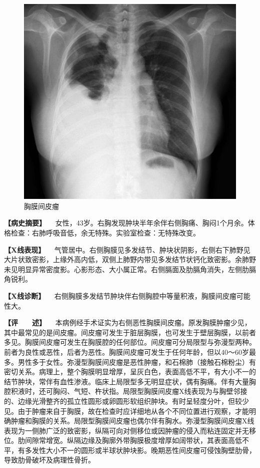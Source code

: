 \begin{figure}[!htbp]
 \centering
 \includegraphics{./images/Image00193.jpg}
 \captionsetup{justification=centering}
 \caption{胸膜间皮瘤}
 \label{fig3-11-7}
  \end{figure} 

\textbf{【病史摘要】}
　女性，43岁。右胸发现肿块半年余伴右侧胸痛、胸闷1个月余。体格检查：右肺呼吸音低，余无特殊。实验室检查：无特殊改变。

\textbf{【X线表现】}
　气管居中。右侧胸膜见多发结节、肿块状阴影，右侧右下肺野见大片状致密影，上缘外高内低，双侧上肺野内带见多发结节状钙化致密影。余肺野未见明显异常密度影。心影形态、大小属正常。右侧膈面及肋膈角消失，左侧肋膈角锐利。

\textbf{【X线诊断】}
　右侧胸膜多发结节肿块伴右侧胸腔中等量积液，胸膜间皮瘤可能性大。

\textbf{【评　　述】}
　本病例经手术证实为右侧恶性胸膜间皮瘤。原发胸膜肿瘤少见，其中最常见的是间皮瘤。间皮瘤可发生于脏层胸膜，也可发生于壁层胸膜，以前者多见。胸膜间皮瘤可发生在胸膜腔的任何部位。间皮瘤可分局限型与弥漫型两种。前者为良性或恶性，后者为恶性。胸膜间皮瘤可发生于任何年龄，但以40～60岁最多。男性多于女性。弥漫型胸膜间皮瘤是恶性肿瘤，和石棉肺（接触石棉粉尘）有密切关系。病理上，整个胸膜明显增厚，呈灰白色，表面高低不平，有大小不一的结节肿块，常伴有血性渗液。临床上局限型多无明显症状，偶有胸痛。伴有大量胸腔积液时，还可胸闷、气短、杵状指。局限型胸膜间皮瘤X线表现为与胸壁邻接的、边缘光滑整齐的孤立性圆形或卵圆形软组织肿块。有时呈轻度分叶，但较少见。由于肿瘤来自于胸膜，故在检查时应详细地从各个不同位置进行观察，才能明确肿瘤和胸膜的关系。局限型胸膜间皮瘤也偶尔伴有胸水。弥漫型胸膜间皮瘤X线表现为一侧肺广泛的致密影，纵隔可向对侧移位或因肿瘤的侵入而粘连固定并无移位。肋间隙常增宽。纵隔边缘及胸廓外带胸膜极度增厚如阔带状，其表面高低不平，有多发性大小不一的圆形或半球状肿块影。晚期恶性间皮瘤可侵蚀胸壁肋骨，导致肋骨破坏及病理性骨折。

